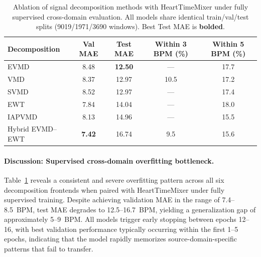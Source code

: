 
\begin{table}[htbp]
\centering
\caption{Ablation of signal decomposition methods with HeartTimeMixer under fully supervised cross-domain evaluation. All models share identical train/val/test splits (9019/1971/3690 windows). Best Test MAE is \textbf{bolded}.}
\label{tab:decomposition_ablation}
\begin{tabular}{lcccc}
\toprule
\textbf{Decomposition} & \textbf{Val MAE} & \textbf{Test MAE} & \textbf{Within 3 BPM (\%)} & \textbf{Within 5 BPM (\%)} \\
\midrule
EVMD              & 8.48 & \textbf{12.50} & ---  & 17.7 \\
VMD               & 8.37 & 12.97 & 10.5 & 17.2 \\
SVMD              & 8.52 & 12.97 & ---  & 17.4 \\
EWT               & 7.84 & 14.04 & ---  & 18.0 \\
IAPVMD            & 8.13 & 14.96 & ---  & 15.5 \\
Hybrid EVMD--EWT  & \textbf{7.42} & 16.74 & 9.5  & 15.6 \\
\bottomrule
\end{tabular}
\end{table}

\paragraph{Discussion: Supervised cross-domain overfitting bottleneck.}
Table~\ref{tab:decomposition_ablation} reveals a consistent and severe overfitting pattern across all six decomposition frontends when paired with HeartTimeMixer under fully supervised training. Despite achieving validation MAE in the range of 7.4--8.5~BPM, test MAE degrades to 12.5--16.7~BPM, yielding a generalization gap of approximately 5--9~BPM. All models trigger early stopping between epochs 12--16, with best validation performance typically occurring within the first 1--5 epochs, indicating that the model rapidly memorizes source-domain-specific patterns that fail to transfer.

